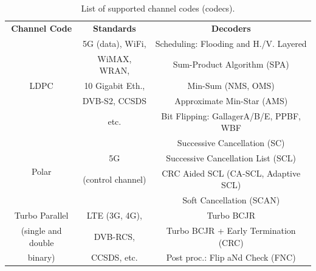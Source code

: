 \begin{table}
  \centering
  \caption{List of supported channel codes (codecs).}
  \label{tab:lib_codecs}
  \begin{tabular}{ c | c | c }
  \multirow{2}{*}{\textbf{Channel Code}}   & \multirow{2}{*}{\textbf{Standards}} & \multirow{2}{*}{\textbf{Decoders}}     \\
                                           &                                     &                                        \\
  \hline
  \hline
  \multirow{5}{*}{{LDPC}}                  & 5G (data), WiFi,                    & Scheduling: Flooding and H./V. Layered \\
                                           & WiMAX, WRAN,                        & Sum-Product Algorithm (SPA)            \\
                                           & 10 Gigabit Eth.,                    & Min-Sum (NMS, OMS)                     \\
                                           & DVB-S2, CCSDS                       & Approximate Min-Star (AMS)             \\
                                           & etc.                                & Bit Flipping: GallagerA/B/E, PPBF, WBF \\
  \hline
  \multirow{4}{*}{{Polar}}                 &                                     & Successive Cancellation (SC)           \\
                                           & 5G                                  & Successive Cancellation List (SCL)     \\
                                           & (control channel)                   & CRC Aided SCL (CA-SCL, Adaptive SCL)   \\
                                           &                                     & Soft Cancellation (SCAN)               \\
  \hline
  \multirow{1}{*}{{Turbo Parallel}}        & LTE (3G, 4G),                       & Turbo BCJR                             \\
  (single and double                       & DVB-RCS,                            & Turbo BCJR + Early Termination (CRC)   \\
  binary)                                  & CCSDS, etc.                         & Post proc.: Flip aNd Check (FNC)       \\

\end{tabular}
\end{table}
